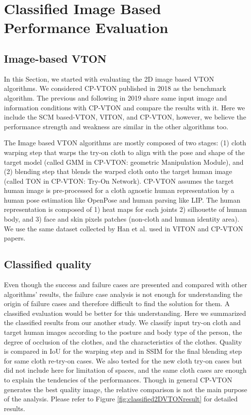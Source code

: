 \section{Classified Image Based Performance Evaluation}

\subsection{Image-based VTON}

In this Section, we started with evaluating the 2D image based VTON algorithms. We considered CP-VTON\cite{Wang2018TowardCI} published in 2018 as the benchmark algorithm. The previous and following in 2019 share same input image and information conditions with CP-VTON and compare the results with it. Here we include the SCM based-VTON, VITON\cite{Han2017VITONAI}, and  CP-VTON\cite{Wang2018TowardCI}, however, we believe the performance strength and weakness are similar in the other algorithms too.


The Image based VTON algorithms are mostly composed of two stages: (1) cloth warping step that warps the try-on cloth to align with the pose and shape of the target model (called GMM in CP-VTON: geometric Manipulation Module)\cite{Wang2018TowardCI}, and (2) blending step that blends the warped cloth onto the target human image (called TON in CP-VTON: Try-On Network)\cite{Wang2018TowardCI}. CP-VTON assumes the target human image is pre-processed for a cloth agnostic human representation by a human pose estimation like OpenPose\cite{Cao2018OpenPoseRM} and human parsing like LIP\cite{Liang2018LookIP}. The human representation is composed of 1) heat maps for each joints 2) silhouette of human body, and 3) face and skin pixels patches (non-cloth and human identity area). We use the same dataset collected by Han et al. used in VITON\cite{Han2017VITONAI} and CP-VTON\cite{Wang2018TowardCI} papers.
 

\subsection{Classified quality}

Even though the success and failure cases are presented and compared with other algorithms' results, the failure case analysis is not enough for understanding the origin of failure cases and therefore difficult to find the solution for them. A classified evaluation would be better for this understanding. Here we summarized the classified results from our another study. We classify input try-on cloth and target human images according to the posture and body type of the person, the degree of occlusion of the clothes, and the characteristics of the clothes. Quality is compared in IoU for the warping step and in SSIM for the final blending step for same cloth re-try-on cases. We also tested for the new cloth try-on cases but did not include here for limitation of spaces, and the same cloth cases are enough to explain the tendencies of the performances. Though in general CP-VTON generates the best quality image, the relative comparison is not the main purpose of the analysis. Please refer to Figure \ref{fig:classified2DVTONresult} for detailed results.


